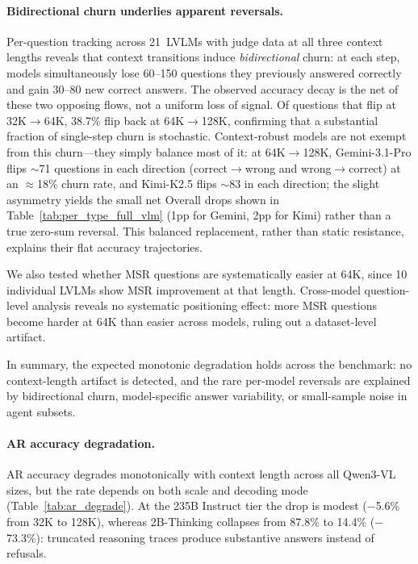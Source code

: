 \documentclass{llmxive}
\begin{document}
\paragraph{Bidirectional churn underlies apparent reversals.}
Per-question tracking across 21~LVLMs with judge data at all three context lengths reveals that context transitions induce \emph{bidirectional} churn: at each step, models simultaneously lose 60--150 questions they previously answered correctly and gain 30--80 new correct answers.
The observed accuracy decay is the net of these two opposing flows, not a uniform loss of signal.
Of questions that flip at 32K$\to$64K, 38.7\% flip back at 64K$\to$128K, confirming that a substantial fraction of single-step churn is stochastic.
Context-robust models are not exempt from this churn---they simply balance most of it: at 64K$\to$128K, Gemini-3.1-Pro flips ${\sim}$71 questions in each direction (correct$\to$wrong and wrong$\to$correct) at an ${\approx}$18\% churn rate, and Kimi-K2.5 flips ${\sim}$83 in each direction; the slight asymmetry yields the small net Overall drops shown in Table~\ref{tab:per_type_full_vlm} (1pp for Gemini, 2pp for Kimi) rather than a true zero-sum reversal.
This balanced replacement, rather than static resistance, explains their flat accuracy trajectories.

We also tested whether MSR questions are systematically easier at 64K, since 10 individual LVLMs show MSR improvement at that length.
Cross-model question-level analysis reveals no systematic positioning effect: more MSR questions become harder at 64K than easier across models, ruling out a dataset-level artifact.

In summary, the expected monotonic degradation holds across the benchmark: no context-length artifact is detected, and the rare per-model reversals are explained by bidirectional churn, model-specific answer variability, or small-sample noise in agent subsets.



\paragraph{AR accuracy degradation.}
\label{app:ar_degrade}

AR accuracy degrades monotonically with context length across all Qwen3-VL sizes, but the rate depends on both scale and decoding mode (Table~\ref{tab:ar_degrade}). At the 235B Instruct tier the drop is modest ($-$5.6\% from 32K to 128K), whereas 2B-Thinking collapses from 87.8\% to 14.4\% ($-$73.3\%): truncated reasoning traces produce substantive answers instead of refusals.
\end{document}
